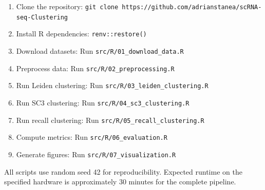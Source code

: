 \begin{enumerate}[noitemsep]
    \item Clone the repository: \texttt{git clone https://github.com/adrianstanea/scRNA-seq-Clustering}
    \item Install R dependencies: \texttt{renv::restore()}
    \item Download datasets: Run \texttt{src/R/01\_download\_data.R}
    \item Preprocess data: Run \texttt{src/R/02\_preprocessing.R}
    \item Run Leiden clustering: Run \texttt{src/R/03\_leiden\_clustering.R}
    \item Run SC3 clustering: Run \texttt{src/R/04\_sc3\_clustering.R}
    \item Run recall clustering: Run \texttt{src/R/05\_recall\_clustering.R}
    \item Compute metrics: Run \texttt{src/R/06\_evaluation.R}
    \item Generate figures: Run \texttt{src/R/07\_visualization.R}
\end{enumerate}

All scripts use random seed 42 for reproducibility. Expected runtime on the specified hardware is approximately 30 minutes for the complete pipeline.
